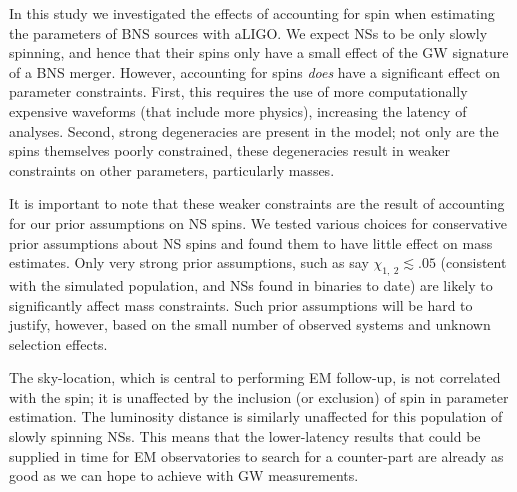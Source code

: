 In this study we investigated the effects of accounting for spin when estimating the parameters of BNS sources with aLIGO. We expect NSs to be only slowly spinning, and hence that their spins only have a small effect of the GW signature of a BNS merger. However, accounting for spins \emph{does} have a significant effect on parameter constraints. First, this requires the use of more computationally expensive waveforms (that include more physics), increasing the latency of analyses. Second, strong degeneracies are present in the model; not only are the spins themselves poorly constrained, these degeneracies result in weaker constraints on other parameters, particularly masses.

It is important to note that these weaker constraints are the result of accounting for our prior assumptions on NS spins.  We tested various choices for conservative prior assumptions about NS spins and found them to have little effect on mass estimates.  Only very strong prior assumptions, such as say $\chi_{1,~2}\lesssim .05$ (consistent with the simulated population, and NSs found in binaries to date) are likely to significantly affect mass constraints.  Such prior assumptions will be hard to justify, however, based on the small number of observed systems and unknown selection effects. 

The sky-location, which is central to performing EM follow-up, is not correlated with the spin; it is unaffected by the inclusion (or exclusion) of spin in parameter estimation. The luminosity distance is similarly unaffected for this population of slowly spinning NSs. This means that the lower-latency results that could be supplied in time for EM observatories to search for a counter-part are already as good as we can hope to achieve with GW measurements.
  
  